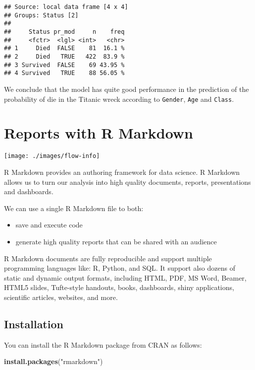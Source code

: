 \documentclass[]{book}
\newenvironment{Shaded}{\begin{snugshade}}{\end{snugshade}}
\newcommand{\KeywordTok}[1]{\textcolor[rgb]{0.13,0.29,0.53}{\textbf{{#1}}}}
\newcommand{\StringTok}[1]{\textcolor[rgb]{0.31,0.60,0.02}{{#1}}}
\newcommand{\NormalTok}[1]{{#1}}
\providecommand{\tightlist}{%
  \setlength{\itemsep}{0pt}\setlength{\parskip}{0pt}}
\def\tightlist{}
\begin{document}
\begin{verbatim}
## Source: local data frame [4 x 4]
## Groups: Status [2]
## 
##     Status pr_mod     n    freq
##     <fctr>  <lgl> <int>   <chr>
## 1     Died  FALSE    81  16.1 %
## 2     Died   TRUE   422  83.9 %
## 3 Survived  FALSE    69 43.95 %
## 4 Survived   TRUE    88 56.05 %
\end{verbatim}

We conclude that the model has quite good performance in the prediction
of the probability of die in the Titanic wreck according to
\texttt{Gender}, \texttt{Age} and \texttt{Class}.

\chapter{Reports with R Markdown}\label{reports-with-r-markdown}

\texttt{[image: ./images/flow-info]}

R Markdown provides an authoring framework for data science. R Markdown
allows us to turn our analysis into high quality documents, reports,
presentations and dashboards.

\clearpage

We can use a single R Markdown file to both:

\begin{itemize}
\tightlist
\item
  save and execute code
\item
  generate high quality reports that can be shared with an audience
\end{itemize}

R Markdown documents are fully reproducible and support multiple
programming languages like: R, Python, and SQL. It support also dozens
of static and dynamic output formats, including HTML, PDF, MS Word,
Beamer, HTML5 slides, Tufte-style handouts, books, dashboards, shiny
applications, scientific articles, websites, and more.

\section{Installation}\label{installation}

You can install the R Markdown package from CRAN as follows:

\begin{Shaded}
\begin{Highlighting}[]
\KeywordTok{install.packages}\NormalTok{(}\StringTok{"rmarkdown"}\NormalTok{)}
\end{Highlighting}
\end{Shaded}
\end{document}
